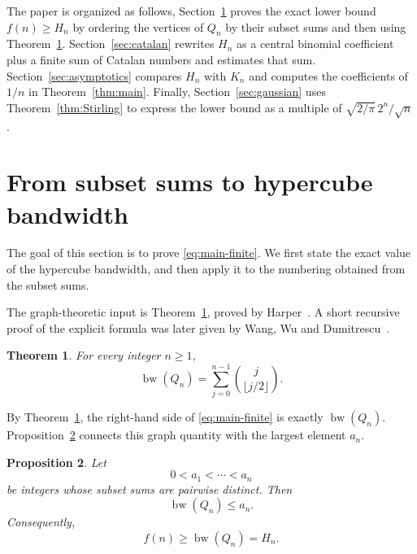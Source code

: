 \documentclass[10pt]{amsart}
\newtheorem{theorem}{Theorem}[section]
\newtheorem{proposition}[theorem]{Proposition}
\numberwithin{equation}{section}
\newcommand{\bw}{\operatorname{bw}}
\begin{document}
The paper is organized as follows, Section~\ref{sec:transfer} proves the exact lower bound
$f(n)\ge H_n$ by ordering the vertices of $Q_n$ by their subset sums and then
using Theorem~\ref{thm:Harper}.  Section~\ref{sec:catalan}
rewrites $H_n$ as a central binomial coefficient plus a finite sum of Catalan
numbers and estimates that sum.  Section~\ref{sec:asymptotics} compares $H_n$ with $K_n$ and computes the
coefficients of $1/n$ in Theorem~\ref{thm:main}.  Finally,
Section~\ref{sec:gaussian} uses Theorem~\ref{thm:Stirling} to express the lower bound
as a multiple of $\sqrt{2/\pi}\,2^n/\sqrt n$.

\section{From subset sums to hypercube bandwidth}\label{sec:transfer}

The goal of this section is to prove \cref{eq:main-finite}.  We first state
the exact value of the hypercube bandwidth, and then apply it to the numbering
obtained from the subset sums.

The graph-theoretic input is Theorem~\ref{thm:Harper}, proved by
Harper~\cite{Harper}.  A short recursive proof of the explicit formula was
later given by Wang, Wu and Dumitrescu~\cite{WangWuDumitrescu}.

\begin{theorem}\label{thm:Harper}
For every integer $n\ge1$,
\begin{equation}\label{eq:Harper}
 \bw(Q_n)=\sum_{j=0}^{n-1}\binom{j}{\lfloor j/2\rfloor}.
\end{equation}
\end{theorem}

By Theorem~\ref{thm:Harper}, the right-hand side of \cref{eq:main-finite} is exactly
$\bw(Q_n)$.  Proposition~\ref{prop:transfer} connects this graph quantity with the
largest element $a_n$.

\begin{proposition}\label{prop:transfer}
Let
\[
 0<a_1<\cdots<a_n
\]
be integers whose subset sums are pairwise distinct.  Then
\[
 \bw(Q_n)\le a_n.
\]
Consequently,
\[
 f(n)\ge \bw(Q_n)=H_n.
\]
\end{proposition}
\end{document}
